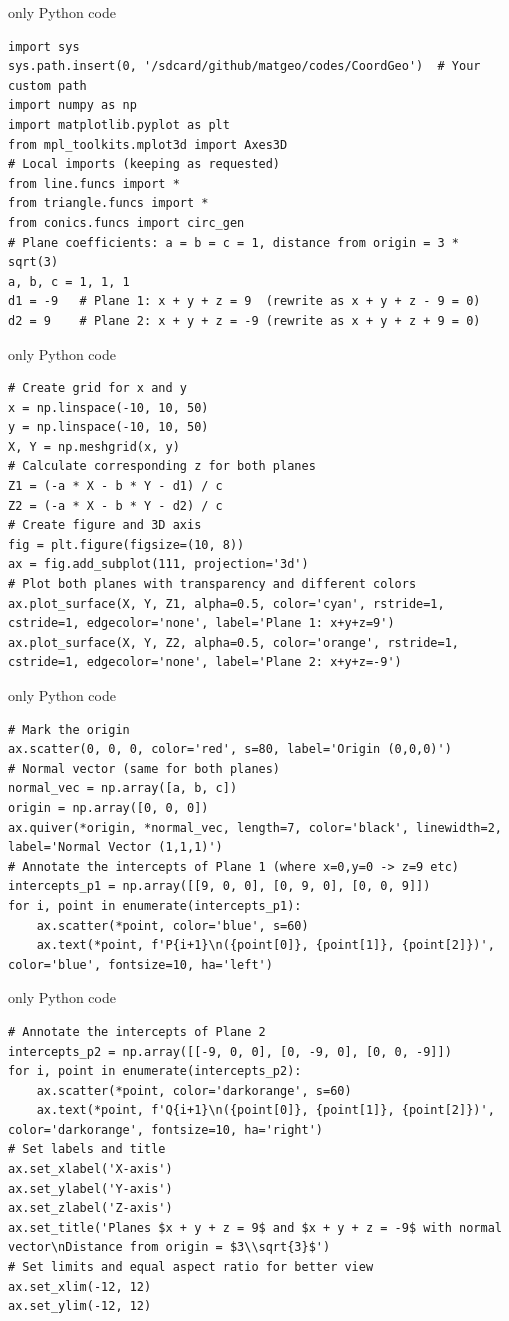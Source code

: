 \documentclass{beamer}
\begin{document}
\begin{frame}[fragile]{only Python code}
\begin{lstlisting}
import sys
sys.path.insert(0, '/sdcard/github/matgeo/codes/CoordGeo')  # Your custom path
import numpy as np
import matplotlib.pyplot as plt
from mpl_toolkits.mplot3d import Axes3D
# Local imports (keeping as requested)
from line.funcs import *
from triangle.funcs import *
from conics.funcs import circ_gen
# Plane coefficients: a = b = c = 1, distance from origin = 3 * sqrt(3)
a, b, c = 1, 1, 1
d1 = -9   # Plane 1: x + y + z = 9  (rewrite as x + y + z - 9 = 0)
d2 = 9    # Plane 2: x + y + z = -9 (rewrite as x + y + z + 9 = 0)
 \end{lstlisting}
\end{frame}
\begin{frame}[fragile]{only Python code}
\begin{lstlisting}
# Create grid for x and y
x = np.linspace(-10, 10, 50)
y = np.linspace(-10, 10, 50)
X, Y = np.meshgrid(x, y)
# Calculate corresponding z for both planes
Z1 = (-a * X - b * Y - d1) / c
Z2 = (-a * X - b * Y - d2) / c
# Create figure and 3D axis
fig = plt.figure(figsize=(10, 8))
ax = fig.add_subplot(111, projection='3d')
# Plot both planes with transparency and different colors
ax.plot_surface(X, Y, Z1, alpha=0.5, color='cyan', rstride=1, cstride=1, edgecolor='none', label='Plane 1: x+y+z=9')
ax.plot_surface(X, Y, Z2, alpha=0.5, color='orange', rstride=1, cstride=1, edgecolor='none', label='Plane 2: x+y+z=-9')
 \end{lstlisting}
\end{frame}
\begin{frame}[fragile]{only Python code}
\begin{lstlisting}
# Mark the origin
ax.scatter(0, 0, 0, color='red', s=80, label='Origin (0,0,0)')
# Normal vector (same for both planes)
normal_vec = np.array([a, b, c])
origin = np.array([0, 0, 0])
ax.quiver(*origin, *normal_vec, length=7, color='black', linewidth=2, label='Normal Vector (1,1,1)')
# Annotate the intercepts of Plane 1 (where x=0,y=0 -> z=9 etc)
intercepts_p1 = np.array([[9, 0, 0], [0, 9, 0], [0, 0, 9]])
for i, point in enumerate(intercepts_p1):
    ax.scatter(*point, color='blue', s=60)
    ax.text(*point, f'P{i+1}\n({point[0]}, {point[1]}, {point[2]})', color='blue', fontsize=10, ha='left')
 \end{lstlisting}
\end{frame}
\begin{frame}[fragile]{only Python code}
\begin{lstlisting}
# Annotate the intercepts of Plane 2
intercepts_p2 = np.array([[-9, 0, 0], [0, -9, 0], [0, 0, -9]])
for i, point in enumerate(intercepts_p2):
    ax.scatter(*point, color='darkorange', s=60)
    ax.text(*point, f'Q{i+1}\n({point[0]}, {point[1]}, {point[2]})', color='darkorange', fontsize=10, ha='right')
# Set labels and title
ax.set_xlabel('X-axis')
ax.set_ylabel('Y-axis')
ax.set_zlabel('Z-axis')
ax.set_title('Planes $x + y + z = 9$ and $x + y + z = -9$ with normal vector\nDistance from origin = $3\\sqrt{3}$')
# Set limits and equal aspect ratio for better view
ax.set_xlim(-12, 12)
ax.set_ylim(-12, 12)
 \end{lstlisting}
\end{frame}
\end{document}
